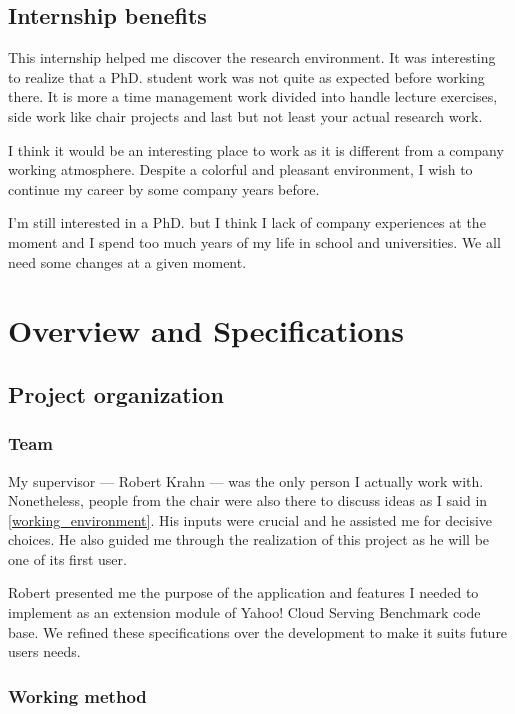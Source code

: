 \documentclass[a4paper,11pt]{report}
\begin{document}
\section{Internship benefits}

This internship helped me discover the research environment. It was interesting to realize that a PhD. student work was not quite as expected before working there. It is more a time management work divided into handle lecture exercises, side work like chair projects and last but not least your actual research work.

I think it would be an interesting place to work as it is different from a company working atmosphere. Despite a colorful and pleasant environment, I wish to continue my career by some company years before. 

I'm still interested in a PhD. but I think I lack of company experiences at the moment and I spend too much years of my life in school and universities. We all need some changes at a given moment.

\clearpage

\chapter{Overview and Specifications}

\section{Project organization}

\subsection{Team}

My supervisor --- Robert Krahn --- was the only person I actually work with. Nonetheless, people from the chair were also there to discuss ideas as I said in \ref{working_environment}. His inputs were crucial and he assisted me for decisive choices. He also guided me through the realization of this project as he will be one of its first user.

Robert presented me the purpose of the application and features I needed to implement as an extension module of Yahoo! Cloud Serving Benchmark code base. We refined these specifications over the development to make it suits future users needs.

\subsection{Working method}\label{working_method}
\end{document}
